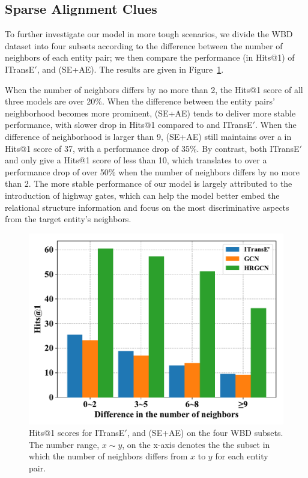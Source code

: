\subsection{Sparse Alignment Clues}
To further investigate our model in more tough scenarios,
we divide the WBD dataset into four subsets according to the difference between the number of neighbors of each entity pair; we then compare the performance (in Hits@1) of ITransE$'$,  \GCN and \HRGCN (SE+AE). %
The results are given in Figure~\ref{subset}.

When the number of neighbors differs by no more than 2, the Hits@1 score of all three models are over 20\%. When the difference between the
entity pairs' neighborhood becomes more prominent, \HRGCN (SE+AE) tends to deliver more stable performance, with slower drop in Hits@1
compared to \GCN and ITransE$'$. When the difference of neighborhood is larger than 9, \HRGCN (SE+AE) still maintains over a in Hits@1
score of 37, with a performance drop of 35\%. By contrast, both ITransE$'$ and \GCN only give a Hits@1 score of less than 10, which
translates to over a performance drop of over 50\% when the number of neighbors differs by no more than 2. The more stable performance of
our \HRGCN model is largely attributed to the introduction of highway gates, which can help the model better embed the relational structure
information and focus on the most discriminative aspects from the target entity's neighbors.


\begin{figure}
	\centering
	\includegraphics[width=1\linewidth]{figures/graph4.pdf}
	\caption{Hits@1 scores for ITransE$'$, \GCN and \HRGCN (SE+AE) on the four WBD subsets. The number range, $x\sim y$, on the
x-axis denotes the the subset in which the number of neighbors differs from $x$ to $y$ for each entity pair.}
	\label{subset}
\end{figure}

